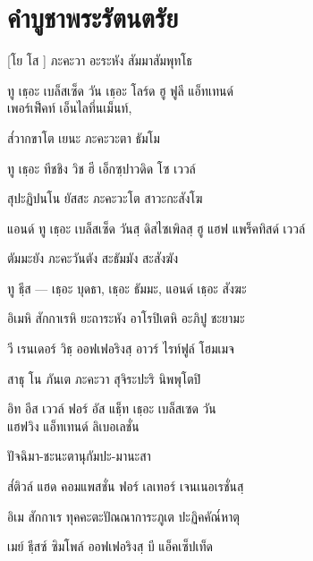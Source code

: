 \chapter{คําบูชาพระรัตนตรัย}

[โย โส ] ภะคะวา อะระหัง สัมมาสัมพุทโธ

\begin{english}
ทู เธฺอะ เบล็สเซ็ด วัน เธฺอะ โลร์ด ฮู ฟูลี แอ็ทเทนด์\\
\vin เพอร์เฟ็คท์ เอ็นไลทึ่นเม็นท์,
\end{english}

ส๎วากขาโต เยนะ ภะคะวะตา ธัมโม

\begin{english}
ทู เธฺอะ ทีชชิง วิช ฮี เอ็กซฺปาวดิด โซ เววล์
\end{english}

สุปะฏิปนโน  ยัสสะ ภะคะวะโต สาวะกะสังโฆ

\begin{english}
แอนด์ ทู เธฺอะ เบล็สเซ็ด วันสฺ ดิสไซเพิลสฺ ฮู แฮฟ แพร็คทิสด์ เววล์
\end{english}

ตัมมะยัง ภะคะวันตัง สะธัมมัง สะสังฆัง

\begin{english}
ทู ธีฺส — เธฺอะ บุดธา, เธฺอะ ธัมมะ, แอนด์ เธฺอะ สังฆะ
\end{english}

อิเมหิ สักกาเรหิ ยะถาระหัง อาโรปิเตหิ อะภิปู ชะยามะ

\begin{english}
วี เรนเดอร์ วิธฺ ออฟเฟอริงสฺ อาวร์ ไรท์ฟูล์ โฮมเมจ
\end{english}

สาธุ โน ภันเต ภะคะวา สุจิระปะริ นิพพุโตปิ

\begin{english}
อิท อีส เววล์ ฟอร์ อัส แธฺ็ท เธฺอะ เบล็สเซด วัน\\
\vin แฮฟวิง แอ็ทเทนด์ ลิเบอเลชั่น
\end{english}

ปัจฉิมา-ชะนะตานุกัมปะ-มานะสา

\begin{english}
ส๎ติวล์ แฮด คอมแพสชั่น ฟอร์ เลเทอร์ เจนเนอเรชั่นสฺ
\end{english}

อิเม สักกาเร ทุคคะตะปัณณาการะภูเต ปะฏิคคัณ๎หาตุ

\begin{english}
เมย์ ธีฺสซ์ ซิมโพล์ ออฟเฟอริงสฺ บี แอ็คเซ็ปเท็ด
\end{english}

